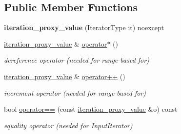 \subsection*{Public Member Functions}
\begin{DoxyCompactItemize}
\item 
\mbox{\label{classnlohmann_1_1detail_1_1iteration__proxy__value_a459dd8961b80b2089d8161c9aa466581}} 
{\bfseries iteration\+\_\+proxy\+\_\+value} (Iterator\+Type it) noexcept
\item 
\mbox{\label{classnlohmann_1_1detail_1_1iteration__proxy__value_a10accadf05a172fdc69a016bec201e81}} 
\mbox{\hyperlink{classnlohmann_1_1detail_1_1iteration__proxy__value}{iteration\+\_\+proxy\+\_\+value}} \& \mbox{\hyperlink{classnlohmann_1_1detail_1_1iteration__proxy__value_a10accadf05a172fdc69a016bec201e81}{operator$\ast$}} ()
\begin{DoxyCompactList}\small\item\em dereference operator (needed for range-\/based for) \end{DoxyCompactList}\item 
\mbox{\label{classnlohmann_1_1detail_1_1iteration__proxy__value_adf4db2aef31822f3a179435158a4de11}} 
\mbox{\hyperlink{classnlohmann_1_1detail_1_1iteration__proxy__value}{iteration\+\_\+proxy\+\_\+value}} \& \mbox{\hyperlink{classnlohmann_1_1detail_1_1iteration__proxy__value_adf4db2aef31822f3a179435158a4de11}{operator++}} ()
\begin{DoxyCompactList}\small\item\em increment operator (needed for range-\/based for) \end{DoxyCompactList}\item 
\mbox{\label{classnlohmann_1_1detail_1_1iteration__proxy__value_af2b78a8b9c9276b07c928b21bb1e2d54}} 
bool \mbox{\hyperlink{classnlohmann_1_1detail_1_1iteration__proxy__value_af2b78a8b9c9276b07c928b21bb1e2d54}{operator==}} (const \mbox{\hyperlink{classnlohmann_1_1detail_1_1iteration__proxy__value}{iteration\+\_\+proxy\+\_\+value}} \&o) const
\begin{DoxyCompactList}\small\item\em equality operator (needed for Input\+Iterator) \end{DoxyCompactList}\item 

\end{DoxyCompactItemize}
